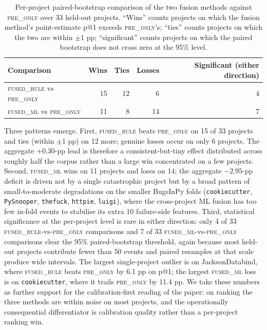 \documentclass[preprint,12pt]{elsarticle}
\begin{document}
\begin{table}[!ht]
\centering
\caption{Per-project paired-bootstrap comparison of the two fusion methods against \textsc{pre\_only} over 33 held-out projects. ``Wins'' counts projects on which the fusion method's point-estimate p@1 exceeds \textsc{pre\_only}'s; ``ties'' counts projects on which the two are within $\pm 1$ pp; ``significant'' counts projects on which the paired bootstrap does not cross zero at the 95\% level.}
\label{tab:perproject-sig}
\small
\begin{tabular}{lrrrr}
\toprule
Comparison & Wins & Ties & Losses & Significant (either direction) \\
\midrule
\textsc{fused\_rule} vs \textsc{pre\_only} & 15 & 12 & 6  & 4 \\
\textsc{fused\_ml}   vs \textsc{pre\_only} & 11 & 8  & 14 & 7 \\
\bottomrule
\end{tabular}
\end{table}

Three patterns emerge. First, \textsc{fused\_rule} beats \textsc{pre\_only} on 15 of 33 projects and ties (within $\pm 1$ pp) on 12 more; genuine losses occur on only 6 projects. The aggregate $+0.30$-pp lead is therefore a consistent-but-tiny effect distributed across roughly half the corpus rather than a large win concentrated on a few projects. Second, \textsc{fused\_ml} wins on 11 projects and loses on 14; the aggregate $-2.95$-pp deficit is driven not by a single catastrophic project but by a broad pattern of small-to-moderate degradations on the smaller BugsInPy folds (\texttt{cookiecutter}, \texttt{PySnooper}, \texttt{thefuck}, \texttt{httpie}, \texttt{luigi}), where the cross-project ML fusion has too few in-fold events to stabilise its extra 10 failure-side features. Third, statistical significance at the per-project level is rare in either direction: only 4 of 33 \textsc{fused\_rule}-vs-\textsc{pre\_only} comparisons and 7 of 33 \textsc{fused\_ml}-vs-\textsc{pre\_only} comparisons clear the 95\% paired-bootstrap threshold, again because most held-out projects contribute fewer than 50 events and paired resamples at that scale produce wide intervals. The largest single-project outlier is on JacksonDatabind, where \textsc{fused\_rule} beats \textsc{pre\_only} by 6.1 pp on p@1; the largest \textsc{fused\_ml} loss is on \texttt{cookiecutter}, where it trails \textsc{pre\_only} by 11.4 pp. We take these numbers as further support for the calibration-first reading of the paper: on ranking the three methods are within noise on most projects, and the operationally consequential differentiator is calibration quality rather than a per-project ranking win.
\end{document}
